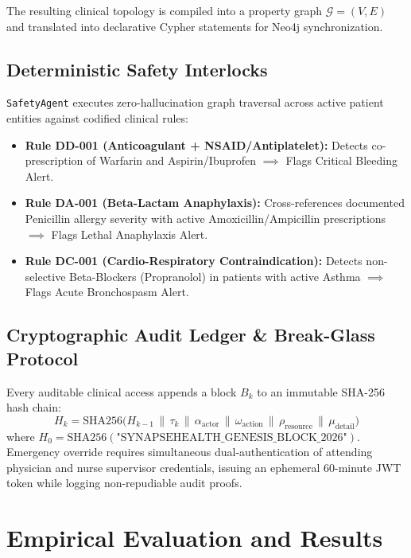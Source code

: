 \documentclass[journal]{IEEEtran}
\begin{document}
The resulting clinical topology is compiled into a property graph $\mathcal{G} = (V, E)$ and translated into declarative Cypher statements for Neo4j synchronization.

\subsection{Deterministic Safety Interlocks}
\texttt{SafetyAgent} executes zero-hallucination graph traversal across active patient entities against codified clinical rules:
\begin{itemize}
    \item \textbf{Rule DD-001 (Anticoagulant + NSAID/Antiplatelet):} Detects co-prescription of Warfarin and Aspirin/Ibuprofen $\implies$ Flags Critical Bleeding Alert.
    \item \textbf{Rule DA-001 (Beta-Lactam Anaphylaxis):} Cross-references documented Penicillin allergy severity with active Amoxicillin/Ampicillin prescriptions $\implies$ Flags Lethal Anaphylaxis Alert.
    \item \textbf{Rule DC-001 (Cardio-Respiratory Contraindication):} Detects non-selective Beta-Blockers (Propranolol) in patients with active Asthma $\implies$ Flags Acute Bronchospasm Alert.
\end{itemize}

\subsection{Cryptographic Audit Ledger & Break-Glass Protocol}
Every auditable clinical access appends a block $B_k$ to an immutable SHA-256 hash chain:
\begin{equation}
H_k = \text{SHA256}\Big( H_{k-1} \, \parallel \, \tau_k \, \parallel \, \alpha_{\text{actor}} \, \parallel \, \omega_{\text{action}} \, \parallel \, \rho_{\text{resource}} \, \parallel \, \mu_{\text{detail}} \Big)
\end{equation}
where $H_0 = \text{SHA256}(\text{"SYNAPSEHEALTH\_GENESIS\_BLOCK\_2026"})$. Emergency override requires simultaneous dual-authentication of attending physician and nurse supervisor credentials, issuing an ephemeral 60-minute JWT token while logging non-repudiable audit proofs.

\section{Empirical Evaluation and Results}
\end{document}

